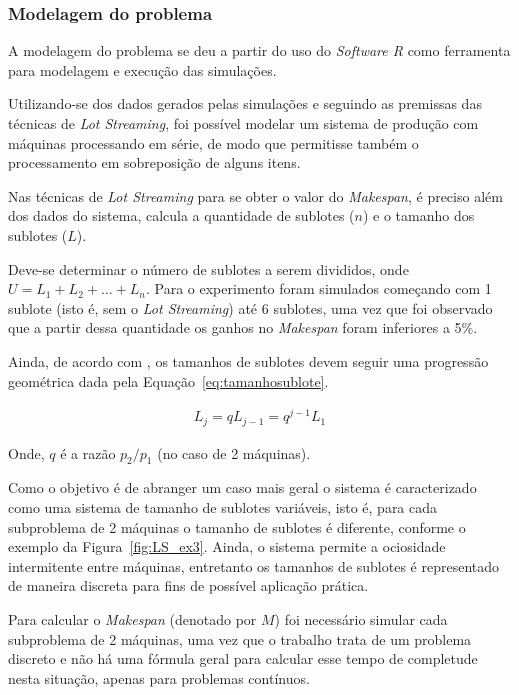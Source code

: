     
    \subsubsection{Modelagem do problema}
    
    A modelagem do problema se deu a partir do uso do \textit{Software R} como ferramenta para modelagem e execução das simulações.
    
    Utilizando-se dos dados gerados pelas simulações e seguindo as premissas das técnicas de \textit{Lot Streaming}, foi possível modelar um sistema de produção com máquinas processando em série, de modo que permitisse também o processamento em sobreposição de alguns itens. 
    
    Nas técnicas de \textit{Lot Streaming} para se obter o valor do \textit{Makespan}, é preciso além dos dados do sistema, calcula a quantidade de sublotes ($n$) e o tamanho dos sublotes ($L$). 
    
    Deve-se determinar o número de sublotes a serem divididos, onde $U = L _ { 1 } + L _ { 2 } + \ldots + L _ { n }$. Para o experimento foram simulados começando com 1 sublote (isto é, sem o \textit{Lot Streaming}) até 6 sublotes, uma vez que foi observado que a partir dessa quantidade os ganhos no \textit{Makespan} foram inferiores a 5\%.
    
    Ainda, de acordo com , os tamanhos de sublotes devem seguir uma progressão geométrica dada pela Equação~\ref{eq:tamanhosublote}. 
    
    \begin{eqnarray}
        L _ { j } = q L _ { j - 1 } = q ^ { j - 1 } L _ { 1 }
        \label{eq:tamanhosublote}
    \end{eqnarray}
    
    Onde, $q$ é a razão $p_2/p_1$ (no caso de 2 máquinas).
    
    Como o objetivo é de abranger um caso mais geral o sistema é caracterizado como uma sistema de tamanho de sublotes variáveis, isto é, para cada subproblema de 2 máquinas o tamanho de sublotes é diferente, conforme o exemplo da Figura~\ref{fig:LS_ex3}. Ainda, o sistema permite a ociosidade intermitente entre máquinas, entretanto os tamanhos de sublotes é representado de maneira discreta para fins de possível aplicação prática. 
    
    Para calcular o \textit{Makespan} (denotado por $M$) foi necessário simular cada subproblema de 2 máquinas, uma vez que o trabalho trata de um problema discreto e não há uma fórmula geral para calcular esse tempo de completude nesta situação, apenas para problemas contínuos.
    
